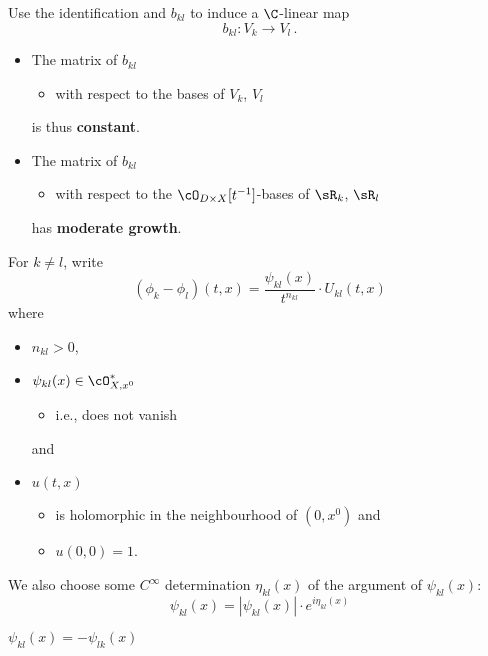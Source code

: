 Use the identification and $b_{kl}$ to induce a $\C$-linear map
\[
  b_{kl}:V_k\to V_l \,.
\]
\begin{rem}
  \begin{itemize}
    \item The matrix of $b_{kl}$
      \begin{itemize}
        \item with respect to the bases of $V_k$, $V_l$
      \end{itemize}
      is thus \textbf{constant}.
    \item The matrix of $b_{kl}$
      \begin{itemize}
        \item with respect to the $\cO_{D\times X}[t^{-1}]$-bases of $\sR_k$,
          $\sR_l$
      \end{itemize}
      has \textbf{moderate growth}.
  \end{itemize}
\end{rem}
For $k\neq l$, write
\[
  (\phi_k-\phi_l)(t,x)=\frac{\psi_{kl}(x)}{t^{n_{kl}}}\cdot U_{kl}(t,x)
\]
where
\begin{itemize}
  \item $n_{kl}>0$,
  \item $\psi_{kl}(x)\in\cO_{X,x^0}^*$
    \begin{itemize}
      \item i.e., does not vanish
    \end{itemize}
    and
  \item $u(t,x)$
    \begin{itemize}
      \item is holomorphic in the neighbourhood of $(0,x^0)$ and
      \item $u(0,0)=1$.
    \end{itemize}
\end{itemize}
We also choose some $C^\infty$ determination $\eta_{kl}(x)$ of the argument of
$\psi_{kl}(x)$:
\[
  \psi_{kl}(x)=|\psi_{kl}(x)|\cdot e^{i\eta_{kl}(x)}
\]
\begin{rem}
  $\psi_{kl}(x)=-\psi_{lk}(x)$
\end{rem}
